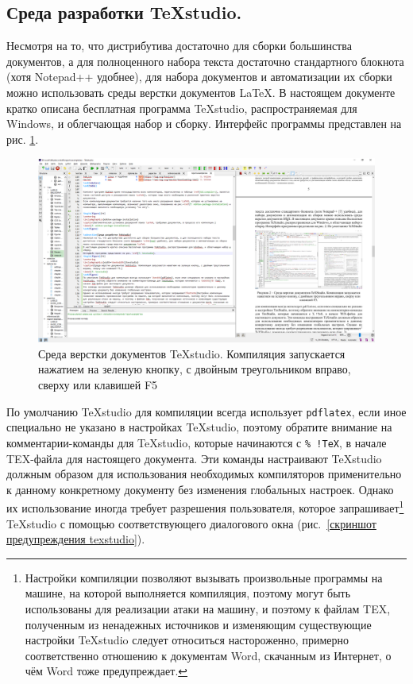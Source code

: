 \documentclass[report, draught]{fefudoc}
\begin{document}
\subsection{Среда разработки TeXstudio.}
Несмотря на то, что дистрибутива достаточно для сборки большинства документов, а для полноценного набора текста достаточно стандартного блокнота (хотя Notepad++ \cite{npp} удобнее), для набора документов и автоматизации их сборки можно использовать среды верстки документов \LaTeX.
В настоящем документе кратко описана бесплатная программа TeXstudio, распространяемая для Windows, и облегчающая набор и сборку.
Интерфейс программы представлен на рис. \ref{скриншот texstudio}.
\begin{figure}[ht]
\centering
\includegraphics[width=\textwidth]{workbook-extras/texstudio}
\caption{Среда верстки документов TeXstudio. Компиляция запускается нажатием на зеленую кнопку, с двойным треугольником вправо, сверху или клавишей F5}
\label{скриншот texstudio}
\end{figure}
По умолчанию TeXstudio для компиляции всегда использует \texttt{pdflatex}, если иное специально не указано в настройках TeXstudio, поэтому обратите внимание на комментарии-команды для TeXstudio, которые начинаются с \texttt{\% !TeX}, в начале TEX-файла для настоящего документа.
Эти команды настраивают TeXstudio должным образом для использования необходимых компиляторов применительно к данному конкретному документу без изменения глобальных настроек.
Однако их использование иногда требует разрешения пользователя, которое запрашивает\footnote{Настройки компиляции позволяют вызывать произвольные программы на машине, на которой выполняется компиляция, поэтому могут быть использованы для реализации атаки на машину, и поэтому к файлам TEX, полученным из ненадежных источников и изменяющим существующие настройки TeXstudio следует относиться настороженно, примерно соответственно отношению к документам Word, скачанным из Интернет, о чём Word тоже предупреждает.} TeXstudio с помощью соответствующего диалогового окна (рис.~\ref{скриншот предупреждения texstudio}).
\end{document}
